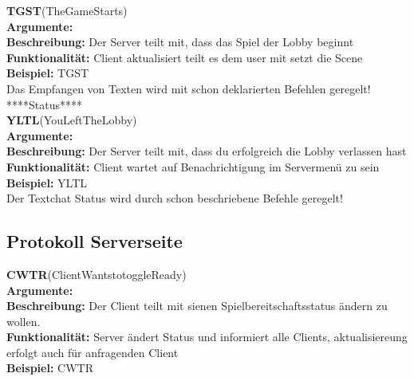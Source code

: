 \documentclass[a4paper, 12pt, oneside, headsepline=.5pt,footsepline=.5pt]{scrartcl}
\begin{document}
{\large \textbf{TGST}(TheGameStarts)} \\
\hspace{4ex} \textbf{Argumente:} {} \\
\hspace{4ex} \textbf{Beschreibung:} {Der Server teilt mit, dass das Spiel der Lobby beginnt} \\
\hspace{4ex} \textbf{Funktionalität:} {Client aktualisiert teilt es dem user mit setzt die Scene} \\
\hspace{4ex} \textbf{Beispiel:} {TGST} \\
Das Empfangen von Texten wird mit schon deklarierten Befehlen geregelt!
****Status**** \\
{\large \textbf{YLTL}(YouLeftTheLobby)} \\
\hspace{4ex} \textbf{Argumente:} {} \\
\hspace{4ex} \textbf{Beschreibung:} {Der Server teilt mit, dass du erfolgreich die Lobby verlassen hast} \\
\hspace{4ex} \textbf{Funktionalität:} {Client wartet auf Benachrichtigung im Servermenü zu sein} \\
\hspace{4ex} \textbf{Beispiel:} {YLTL} \\

Der Textchat Status wird durch schon beschriebene Befehle geregelt!

\subsection{Protokoll Serverseite} 
{\large \textbf{CWTR}(ClientWantstotoggleReady)} \\
\hspace{4ex} \textbf{Argumente:} {} \\
\hspace{4ex} \textbf{Beschreibung:} {Der Client teilt mit sienen Spielbereitschaftsstatus ändern zu wollen.} \\
\hspace{4ex} \textbf{Funktionalität:} {Server ändert Status und informiert alle Clients, aktualisiereung erfolgt auch für anfragenden Client} \\
\hspace{4ex} \textbf{Beispiel:} {CWTR} \\
\end{document}
